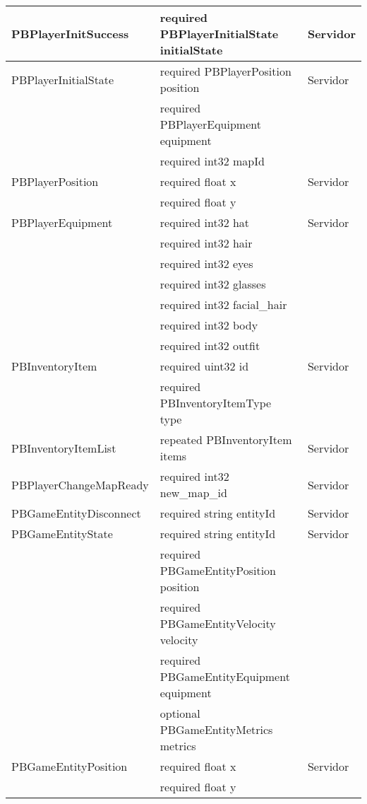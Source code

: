\begin{longtable}{|l|l|l|}
    \hline
    PBPlayerInitSuccess & required PBPlayerInitialState initialState & Servidor \\
    \hline
    PBPlayerInitialState & required PBPlayerPosition position & Servidor \\
                            & required PBPlayerEquipment equipment & \\
                            & required int32 mapId & \\
    \hline
    PBPlayerPosition & required float x & Servidor \\
                        & required float y & \\
    \hline
    PBPlayerEquipment & required int32 hat & Servidor \\
                        & required int32 hair & \\
                        & required int32 eyes & \\
                        & required int32 glasses & \\
                        & required int32 facial\_hair & \\
                        & required int32 body & \\
                        & required int32 outfit & \\
    \hline
    PBInventoryItem & required uint32 id & Servidor \\
                    & required PBInventoryItemType type & \\
    \hline
    PBInventoryItemList & repeated PBInventoryItem items & Servidor \\
    \hline
    PBPlayerChangeMapReady & required int32 new\_map\_id & Servidor \\
    \hline
    PBGameEntityDisconnect & required string entityId & Servidor \\
    \hline
    PBGameEntityState & required string entityId & Servidor \\
                        & required PBGameEntityPosition position & \\
                        & required PBGameEntityVelocity velocity & \\
                        & required PBGameEntityEquipment equipment & \\
                        & optional PBGameEntityMetrics metrics & \\
    \hline
    PBGameEntityPosition & required float x & Servidor \\
                            & required float y & \\

\end{longtable}
